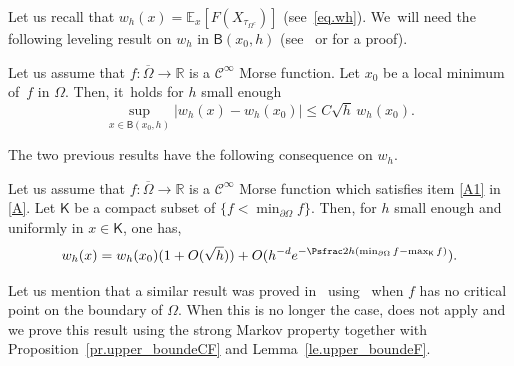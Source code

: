Let us recall that $w_h(x)=\mathbb E_{x} [F(X_{\tau_{\Omega^c}})]$ (see~\eqref{eq.wh}). We~will need the following leveling result on $w_h$ in $\mathsf
B(x_0,h)$ (see~\cite[Lem.\,1]{kamin1979elliptic} or \cite[Lem.\,3]{NePC} for a proof).

\begin{lemma}\label{le.upper_boundeF}
Let us assume that $f:\overline \Omega\to \mathbb R$ is a $\mathcal C^\infty$ Morse function. Let $x_0$ be a local minimum of~$f$ in $\Omega$.
Then, it~holds for $h$ small enough
\[
\sup_{x\in { \mathsf B(x_0,h)}} \vert w_h(x) -w_h(x_0)\vert\le C \sqrt h \, w_h(x_0).
\]
\end{lemma}

The two previous results have the following consequence on $w_h$.

\begin{corollary}\label{co.Px}
Let us assume that $f:\overline \Omega\to \mathbb R$ is a $\mathcal C^\infty$ Morse function which satisfies item \eqref{A1} in \ref{A}.
Let $\mathsf K$ be a compact subset of $\{f<\min_{\partial \Omega}f\}$.
Then, for $h$ small enough and uniformly in $x\in \mathsf K$, one has,
\[
w_h(x) =w_h(x_0)(1+O(\sqrt h))+ O(h^{-d}e^{-\Psfrac 2h (\min_{\partial \Omega }f-\max_{\mathsf K} f)}).
\]
\end{corollary}

Let us mention that a similar result was proved in~\cite[\S5.1.4]{DLLN} using~\cite[Th.\,1]{eizenberg-90} when $f$ has no critical point on the boundary of $\Omega$. When this is no longer the case, \cite[Th.\,1]{eizenberg-90} does not apply and we prove this result using the strong Markov property together with Proposition~\ref{pr.upper_boundeCF} and Lemma~\ref{le.upper_boundeF}.

